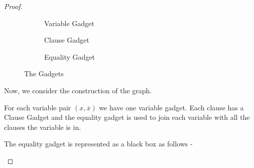 \begin{proof}
\begin{figure}[h!]
\centering
\begin{subfigure}[b]{0.3\textwidth}
	\caption{Variable Gadget}
\end{subfigure} 
\begin{subfigure}[b]{0.3\textwidth}
\centering
	\caption{Clause Gadget}
\end{subfigure}
\begin{subfigure}[b]{0.3\textwidth}
\centering
	
	\caption{Equality Gadget}
\end{subfigure}
\caption{The Gadgets}
\label{fig1Gadgets}
\end{figure}

Now, we consider the construction of the graph.

For each variable pair $(x, \overline{x})$ we have one variable gadget. Each clause has a Clause Gadget and the equality gadget is used to join each variable with all the clauses the variable is in.

The equality gadget is represented as a black box as follows -
\begin{figure}[h!]
\centering
\begin{subfigure}[b]{0.3\textwidth}
\centering
	

\end{subfigure}
\end{figure}
\end{proof}
